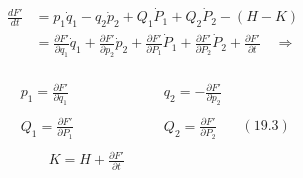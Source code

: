 \documentclass[a4paper]{article}
\begin{document}
\begin{answer}[Punto 19]
        \begin{align*}
            \frac {dF'}{dt} &= p_1\dot q_1 - q_2 \dot p_2 + Q_1\dot P_1 + Q_2 \dot P_2 - (H-K)\\
            &= \frac{\partial F'}{\partial q_1} \dot q_1 + \frac{\partial F'}{\partial p_2} \dot p_2 + \frac{\partial F'}{\partial P_1}\dot P_1+\frac{\partial F'}{\partial P_2} \dot P_2 + \frac{\partial F'}{\partial t} \quad \Rightarrow\\
        \end{align*}

        \begin{equation*}
            \begin{align*}
                p_1 = \frac{\partial F'}{\partial q_1} & \qquad q_2 = -\frac{\partial F'}{\partial p_2} \\\\
                Q_1 = \frac{\partial F'}{\partial P_1} & \qquad Q_2= \frac{\partial F'}{\partial P_2} \\\\
                \qquad K = H+\frac{\partial F'}{\partial t} 
            \end{align*} \quad (19.3)
        \end{equation*}
        

    \end{answer}
    
\end{document}
